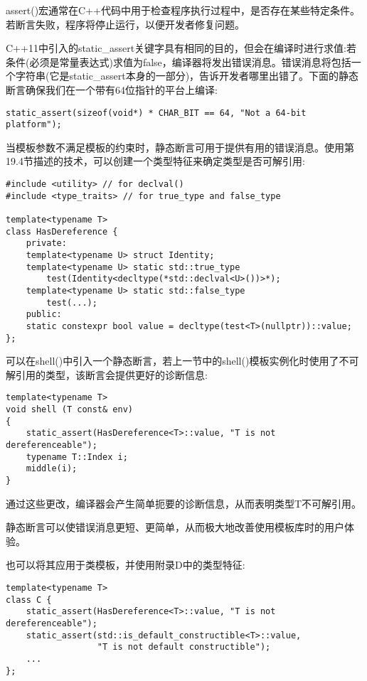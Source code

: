 assert()宏通常在C++代码中用于检查程序执行过程中，是否存在某些特定条件。若断言失败，程序将停止运行，以便开发者修复问题。

C++11中引入的static\_assert关键字具有相同的目的，但会在编译时进行求值:若条件(必须是常量表达式)求值为false，编译器将发出错误消息。错误消息将包括一个字符串(它是static\_assert本身的一部分)，告诉开发者哪里出错了。下面的静态断言确保我们在一个带有64位指针的平台上编译:

\begin{lstlisting}[style=styleCXX]
static_assert(sizeof(void*) * CHAR_BIT == 64, "Not a 64-bit platform");
\end{lstlisting}

当模板参数不满足模板的约束时，静态断言可用于提供有用的错误消息。使用第19.4节描述的技术，可以创建一个类型特征来确定类型是否可解引用:

\begin{lstlisting}[style=styleCXX]
#include <utility> // for declval()
#include <type_traits> // for true_type and false_type

template<typename T>
class HasDereference {
	private:
	template<typename U> struct Identity;
	template<typename U> static std::true_type
		test(Identity<decltype(*std::declval<U>())>*);
	template<typename U> static std::false_type
		test(...);
	public:
	static constexpr bool value = decltype(test<T>(nullptr))::value;
};
\end{lstlisting}

可以在shell()中引入一个静态断言，若上一节中的shell()模板实例化时使用了不可解引用的类型，该断言会提供更好的诊断信息:

\begin{lstlisting}[style=styleCXX]
template<typename T>
void shell (T const& env)
{
	static_assert(HasDereference<T>::value, "T is not dereferenceable");
	typename T::Index i;
	middle(i);
}
\end{lstlisting}

通过这些更改，编译器会产生简单扼要的诊断信息，从而表明类型T不可解引用。

静态断言可以使错误消息更短、更简单，从而极大地改善使用模板库时的用户体验。

也可以将其应用于类模板，并使用附录D中的类型特征:

\begin{lstlisting}[style=styleCXX]
template<typename T>
class C {
	static_assert(HasDereference<T>::value, "T is not dereferenceable");
	static_assert(std::is_default_constructible<T>::value,
				  "T is not default constructible");
	...
};
\end{lstlisting}




































